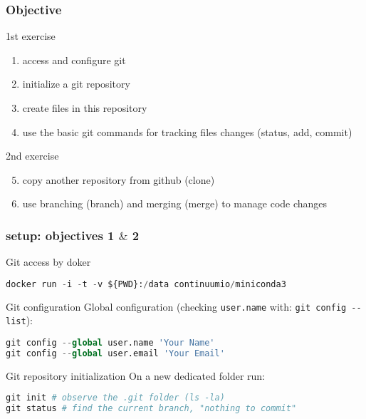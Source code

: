 \begin{frame}[containsverbatim]
\frametitle{ Objective}
\begin{exampleblock}{1st exercise}
\begin{enumerate}
    \item access and configure git
    \item initialize a git repository
    \item create files in this repository
    \item use the basic git commands for tracking files changes (status, add, commit)
\end{enumerate}
\end{exampleblock}
\begin{exampleblock}{2nd exercise}
\begin{enumerate}
\setcounter{enumi}{4}
    \item copy another repository from github (clone)
    \item use branching (branch) and merging (merge) to manage code changes
\end{enumerate}
\end{exampleblock}
\end{frame}
\begin{frame}[containsverbatim]
\frametitle{  setup: objectives 1 $\&$ 2}
\begin{exampleblock}{Git access by doker}
\begin{lstlisting}[language=python]
docker run -i -t -v ${PWD}:/data continuumio/miniconda3
\end{lstlisting}
\end{exampleblock}
\begin{exampleblock}{Git configuration}
Global configuration (checking \verb|user.name| with: \verb|git config --list|):
\begin{lstlisting}[language=python]
git config --global user.name 'Your Name'
git config --global user.email 'Your Email'
\end{lstlisting}
\end{exampleblock}
\begin{exampleblock}{Git repository initialization}
On a new dedicated folder run: 
\begin{lstlisting}[language=python]
git init # observe the .git folder (ls -la)
git status # find the current branch, "nothing to commit"
\end{lstlisting}
\end{exampleblock}
\end{frame}
